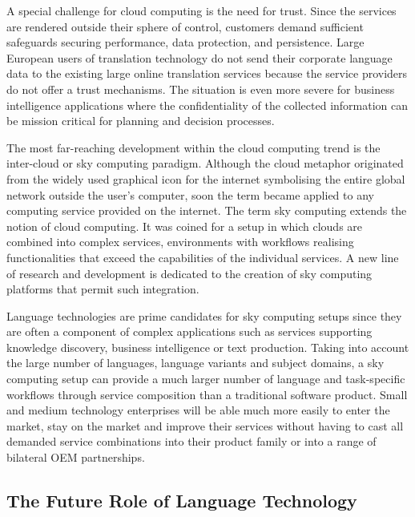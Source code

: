 \documentclass[10pt, plain]{../../metanetpaper}
\begin{document}
\begin{multicols}{2}
A special challenge for cloud computing is the need for trust. Since the services are rendered outside their sphere of control, customers demand sufficient safeguards securing performance, data protection, and persistence. Large European users of translation technology do not send their corporate language data to the existing large online translation services because the service providers do not offer a trust mechanisms. The situation is even more severe for business intelligence applications where the confidentiality of the collected information can be mission critical for planning and decision processes.  

The most far-reaching development within the cloud computing trend is the inter-cloud or sky computing paradigm. Although the cloud metaphor originated from the widely used graphical icon for the internet symbolising the entire global network outside the user’s computer, soon the term became applied to any computing service provided on the internet. The term sky computing extends the notion of cloud computing. It was coined for a setup in which clouds are combined into complex services, environments with workflows realising functionalities that exceed the capabilities of the individual services. A new line of research and development is dedicated to the creation of sky computing platforms that permit such integration.

Language technologies are prime candidates for sky computing setups since they are often a component of complex applications such as services supporting knowledge discovery, business intelligence or text production. Taking into account the large number of languages, language variants and subject domains, a sky computing setup can provide a much larger number of language and task-specific workflows through service composition than a traditional software product. Small and medium technology enterprises will be able much more easily to enter the market, stay on the market and improve their services without having to cast all demanded service combinations into their product family or into a range of bilateral OEM partnerships.

\subsection[The Future Role of Language Technology]{The Future Role of Language Technology}
\label{sec:}


\end{multicols}
\end{document}
